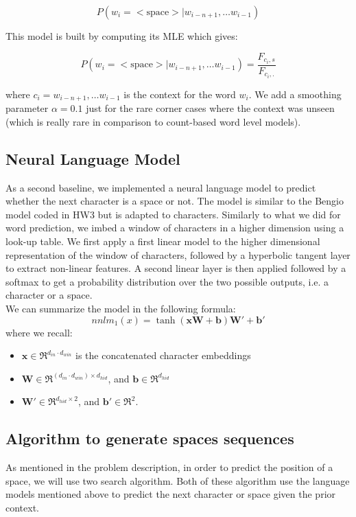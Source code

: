 \documentclass[11pt]{article}
\begin{document}
\[ P(w_i =<\mathrm{space}> | w_{i-n+1}, \ldots w_{i-1}) \]

This model is built by computing its MLE which gives:

\[ P(w_i =<\mathrm{space}> | w_{i-n+1}, \ldots w_{i-1}) = \frac{F_{c_i,s}}{F_{c_i,.}}\]

where $c_i = w_{i-n+1}, \ldots w_{i-1}$ is the context for the word $w_i$. We add a smoothing parameter $\alpha = 0.1$ just for the rare corner cases where the context was unseen (which is really rare in comparison to count-based word level models).

\subsection{Neural Language Model}
As a second baseline, we implemented a neural language model to predict whether the next character is a space or not. The model is similar to the Bengio model coded in HW3 but is adapted to characters. Similarly to what we did for word prediction, we imbed a window of characters in a higher dimension using a look-up table. We first apply a first linear model to the higher dimensional representation of the window of characters, followed by a hyperbolic tangent layer to extract non-linear features. A second linear layer is then applied followed by a softmax to get a probability distribution over the two possible outputs, i.e. a character or a space.\\
\noindent We can summarize the model in the following formula: $$nnlm_1(x) = \tanh(\mathbf{xW}+\mathbf{b})\mathbf{W'}+\mathbf{b'}$$
where we recall:
\begin{itemize}
\item $\boldsymbol{x}\in \Re^{d_{in}\cdot d_{win}}$ is the concatenated character embeddings
\item $\boldsymbol{W}\in \Re^{(d_{in}\cdot d_{win})\times d_{hid}}$, and $\boldsymbol{b}\in \Re^{d_{hid}}$
\item $\boldsymbol{W'}\in \Re^{d_{hid}\times 2}$, and $\boldsymbol{b'}\in \Re^{2}$.
\end{itemize}


\subsection{Algorithm to generate spaces sequences}
As mentioned in the problem description, in order to predict the position of a space, we will use two search algorithm. Both of these algorithm use the language models mentioned above to predict the next character or space given the prior context.
\end{document}
